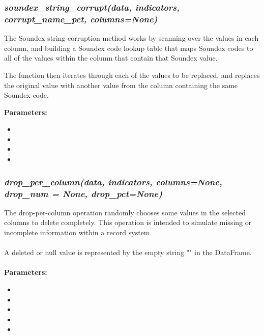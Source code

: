 \documentclass[titlepage, 11pt]{article}
\begin{document}
\subsubsection{\textit{soundex\_string\_corrupt(data, indicators, corrupt\_name\_pct, columns=None)}}

The Soundex string corruption method works by scanning over the values in each column, and building a Soundex code lookup table that maps Soundex codes to all of the values within the column that contain that Soundex value. 

The function then iterates through each of the values to be replaced, and replaces the original value with another value from the column containing the same Soundex code.

\textbf{Parameters:}
\begin{itemize}
    \item \docdata
    \item \docindc
    \item {}
    \item \doccols
\end{itemize}

\subsubsection{\textit{drop\_per\_column(data, indicators, columns=None, drop\_num = None, drop\_pct=None)}}

The drop-per-column operation randomly chooses some values in the selected columns to delete completely. This operation is intended to simulate missing or incomplete information within a record system. 
\\
\\
A deleted or null value is represented by the empty string "" in the DataFrame. 
\\
\\
\textbf{Parameters:}
\begin{itemize}
    \item \docdata
    \item \docindc
    \item \doccols
    \item {}
    \item {}
\end{itemize}
\end{document}
